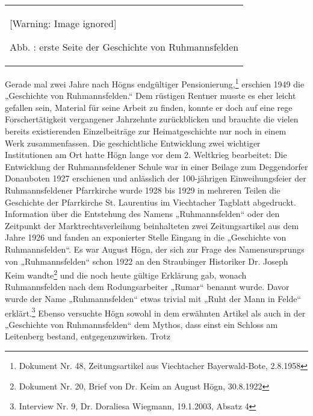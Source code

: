 \documentclass[a4paper]{article}
\newcounter{Abb}
\renewcommand\theAbb{\arabic{Abb}}
\begin{document}
\begin{flushleft}
\tablefirsthead{}
\tablehead{}
\tabletail{}
\tablelasttail{}
\begin{supertabular}{m{5.2310004cm}}

\begin{center}
 [Warning: Image ignored] %

\end{center}
Abb. \stepcounter{Abb}{\theAbb}: erste Seite der Geschichte von
Ruhmannsfelden\\
\end{supertabular}
\end{flushleft}
Gerade mal zwei Jahre nach Högns endgültiger Pensionierung,\footnote{
Dokument Nr. 48, Zeitungsartikel aus Viechtacher Bayerwald-Bote,
2.8.1958} erschien 1949 die „Geschichte von Ruhmannsfelden.“ Dem
rüstigen Rentner musste es eher leicht gefallen sein, Material für
seine Arbeit zu finden, konnte er doch auf eine rege Forschertätigkeit
vergangener Jahrzehnte zurückblicken und brauchte die vielen bereits
existierenden Einzelbeiträge zur Heimatgeschichte nur noch in einem
Werk zusammenfassen. Die geschichtliche Entwicklung zwei wichtiger
Institutionen am Ort hatte Högn lange vor dem 2. Weltkrieg bearbeitet:
Die Entwicklung der Ruhmannsfeldener Schule war in einer Beilage zum
Deggendorfer Donauboten 1927 erschienen und anlässlich der 100-jährigen
Einweihungsfeier der Ruhmannsfeldener Pfarrkirche wurde 1928 bis 1929
in mehreren Teilen die Geschichte der Pfarrkirche St. Laurentius im
Viechtacher Tagblatt abgedruckt. Information über die Entstehung des
Namens „Ruhmannsfelden“ oder den Zeitpunkt der Marktrechtsverleihung
beinhalteten zwei Zeitungsartikel aus dem Jahre 1926 und fanden an
exponierter Stelle Eingang in die „Geschichte von Ruhmannsfelden“. Es
war August Högn, der sich zur Frage des Namensursprungs von
„Ruhmannsfelden“ schon 1922 an den Straubinger Historiker Dr. Joseph
Keim wandte\footnote{ Dokument Nr. 20, Brief von Dr. Keim an August
Högn, 30.8.1922} und die noch heute gültige Erklärung gab, wonach
Ruhmannsfelden nach dem Rodungsarbeiter „Rumar“ benannt wurde. Davor
wurde der Name „Ruhmannsfelden“ etwas trivial mit „Ruht der Mann in
Felde“ erklärt.\footnote{ Interview Nr. 9, Dr. Doraliesa Wiegmann,
19.1.2003, Absatz 4} Ebenso versuchte Högn sowohl in dem erwähnten
Artikel als auch in der „Geschichte von Ruhmannsfelden“ dem Mythos,
dass einst ein Schloss am Leitenberg bestand, entgegenzuwirken. Trotz
\end{document}
